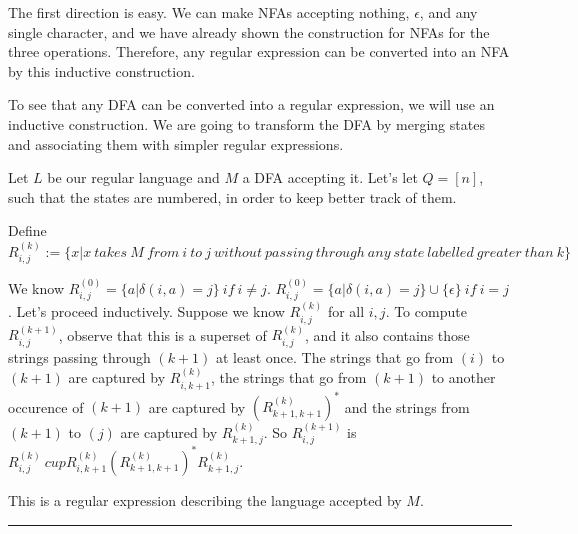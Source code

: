 \documentclass[twoside]{article}
\newenvironment{proof}{{\bf Proof:}}{\hfill\rule{2mm}{2mm}}
\begin{document}
\begin{proof}
	
	The first direction is easy.  We can make NFAs accepting nothing, $\epsilon$, and any single character, and we have already shown the construction for NFAs for the three operations.  Therefore, any regular expression can be converted into an NFA by this inductive construction.
	
	To see that any DFA can be converted into a regular expression, we will use an inductive construction.  We are going to transform the DFA by merging states and associating them with simpler regular expressions.
	
	Let $L$ be our regular language and $M$ a DFA accepting it.  Let's let $Q=[n]$, such that the states are numbered, in order to keep better track of them.
	
	Define $R_{i,j}^{(k)}:=\{x|x \ takes \ M \ from \ i \ to \ j\ without\ passing \ through\ any \ state\ labelled \ greater \ than \ k \}$
	
	We know $R^{(0)}_{i,j} = \{a|\delta(i,a) = j\} \ if \ i\neq j$.  $R^{(0)}_{i,j} = \{a|\delta(i,a) = j\}\cup\{\epsilon\} \ if \ i= j$.  Let's proceed inductively.  Suppose we know $R_{i,j}^{(k)}$ for all $i,j$.  To compute $R_{i,j}^{(k+1)}$, observe that this is a superset of $R_{i,j}^{(k)}$, and it also contains those strings passing through $(k+1)$ at least once.  The strings that go from $(i)$ to $(k+1)$ are captured by $R_{i,k+1}^{(k)}$, the strings that go from $(k+1)$ to another occurence of $(k+1)$ are captured by $(R_{k+1,k+1}^{(k)})^*$ and the strings from $(k+1)$ to $(j)$ are captured by $R_{k+1,j}^{(k)}$.  So $R_{i,j}^{(k+1)}$ is  $R_{i,j}^{(k)} \ cup 
	R_{i,k+1}^{(k)} (R_{k+1,k+1}^{(k)})^*R_{k+1,j}^{(k)}$.
	
	This is a regular expression describing the language accepted by $M$.


\end{proof}
\end{document}
